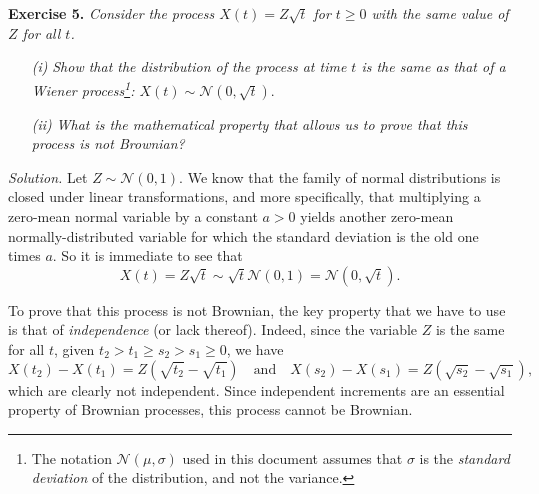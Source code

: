 
\textbf{Exercise 5. }\emph{Consider the process \( X(t) = Z\sqrt{t} \) for \( t \geq 0 \) with the same value of \( Z \) for all \( t \).}
\begin{enumerate}
  \item[\textit{(i)}] \emph{Show that the distribution of the process at time \( t \) is the same as that of a Wiener process\footnote{The notation $\mathcal N(\mu, \sigma)$ used in this document assumes that $\sigma$ is the \textit{standard deviation} of the distribution, and not the variance.}: \( X(t) \sim \mathcal{N}(0, \sqrt{t}) \)}.
  \item[\textit{(ii)}] \emph{What is the mathematical property that allows us to prove that this process is not Brownian?}
\end{enumerate}

\emph{Solution.} Let \( Z \sim \mathcal{N}(0, 1) \). We know that the family of normal distributions is closed under linear transformations, and more specifically, that multiplying a zero-mean normal variable by a constant $a>0$ yields another zero-mean normally-distributed variable for which the standard deviation is the old one times $a$. So it is immediate to see that
\[
X(t) = Z \sqrt{t} \sim \sqrt{t}\mathcal{N}(0, 1) = \mathcal{N}(0, \sqrt t).\]

To prove that this process is not Brownian, the key property that we have to use is that of \textit{independence} (or lack thereof). Indeed, since the variable $Z$ is the same for all $t$, given $t_2>t_1\geq s_2> s_1\geq 0$, we have
\[
X(t_2) - X(t_1) = Z(\sqrt{t_2} - \sqrt{t_1}) \quad \text{and} \quad X(s_2) - X(s_1) = Z(\sqrt{s_2} - \sqrt{s_1}),
\]
which are clearly not independent. Since independent increments are an essential property of Brownian processes, this process cannot be Brownian.
